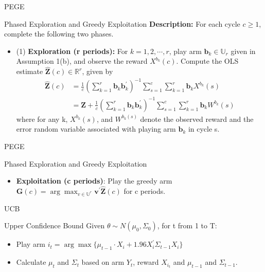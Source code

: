 \documentclass[serif]{beamer}
\begin{document}
\begin{frame}{PEGE}

\begin{block}{Phased Exploration and Greedy Exploitation}
\textbf{Description:} For each cycle $c\geq 1$, complete the following two phases.
\begin{itemize}
\item (1) \textbf{Exploration (r periods):} For $k=1,2,\cdots,r$, play arm $\textbf{b}_{k}\in \mathbb{U}_{r}$ given in Assumption 1(b), and observe the reward $X^{b_{k}}(c)$. Compute the OLS estimate $\hat{\textbf{Z}}(c)\in \mathbb{R}^{r}$, given by
\begin{align}
\hat{\textbf{Z}}(c)&=\frac{1}{c}(\sum_{k=1}^{r}\textbf{b}_{k}\textbf{b}_{k}^{'})^{-1}\sum_{s=1}^{c}\sum_{k=1}^{r}\textbf{b}_{k}X^{b_{k}}(s) \nonumber \\
&=\textbf{Z}+\frac{1}{c}(\sum_{k=1}^{r}\textbf{b}_{k}\textbf{b}_{k}^{'})^{-1}\sum_{s=1}^{c}\sum_{k=1}^{r}\textbf{b}_{k}W^{b_{k}}(s) \nonumber 
\end{align}
where for any k, $X^{b_{k}}(s)$, and $W^{b_{k}(s)}$ denote the observed reward and the error random variable associated with playing arm $\textbf{b}_{k}$ in cycle s.
\end{itemize}

\end{block}

\end{frame}


\begin{frame}{PEGE}

\begin{block}{Phased Exploration and Greedy Exploitation}
\begin{itemize}
\item \textbf{Exploitation (c periods)}: Play the greedy arm $\textbf{G}(c)=\arg \max_{v\in \mathbb{U}^{r}}\textbf{v}^{'}\hat{\textbf{Z}}(c)$ for c periods.
\end{itemize}
\end{block}


\end{frame}
\begin{frame}{UCB}
\begin{block}{Upper Confidence Bound}
Given $\theta \sim N(\mu_{0},\Sigma_{0})$, for t from 1 to T:
\begin{itemize}
\item Play arm $i_{t}=\arg\max\{\mu_{t-1}\cdot X_{i} + 1.96X_{i}^{'}\Sigma_{t-1} X_{i}\}$
\item Calculate $\mu_{t}$ and $\Sigma_{t}$ based on arm $Y_{t}$, reward $X_{i_{t}}$ and $\mu_{t-1}$ and $\Sigma_{t-1}$.
\end{itemize}

\end{block}

\end{frame}
\end{document}
